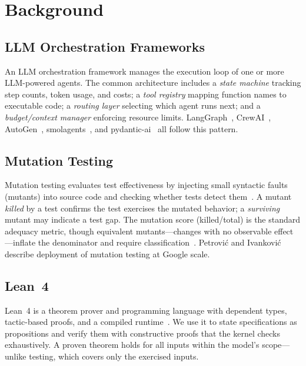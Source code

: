 \documentclass[11pt,a4paper]{article}
\begin{document}
\section{Background}
\label{sec:background}

\subsection{LLM Orchestration Frameworks}

An LLM orchestration framework manages the execution loop of one or
more LLM-powered agents. The common architecture includes a
\emph{state machine} tracking step counts, token usage, and costs;
a \emph{tool registry} mapping function names to executable code;
a \emph{routing layer} selecting which agent runs next; and a
\emph{budget/context manager} enforcing resource limits. LangGraph~\cite{langgraph2024},
CrewAI~\cite{crewai2024}, AutoGen~\cite{autogen2024},
smolagents~\cite{smolagents2024}, and
pydantic-ai~\cite{pydanticai2024} all follow this pattern.

\subsection{Mutation Testing}

Mutation testing evaluates test effectiveness by injecting small
syntactic faults (mutants) into source code and checking whether tests
detect them~\cite{demillo1978hints,jia2011analysis}. A mutant
\emph{killed} by a test confirms the test exercises the mutated
behavior; a \emph{surviving} mutant may indicate a test gap.
The mutation score (killed/total) is the standard adequacy metric,
though equivalent mutants---changes with no observable
effect---inflate the denominator and require
classification~\cite{papadakis2019mutation,ammann2014establishing}.
Petrovi\'c and Ivankovi\'c~\cite{petrovic2018state} describe
deployment of mutation testing at Google scale.

\subsection{Lean~4}

Lean~4 is a theorem prover and programming language with dependent
types, tactic-based proofs, and a compiled
runtime~\cite{demoura2021lean4}. We use it to state specifications
as propositions and verify them with constructive proofs that the
kernel checks exhaustively. A proven theorem holds for all inputs
within the model's scope---unlike testing, which covers only the
exercised inputs.
\end{document}
